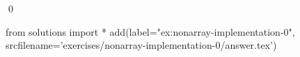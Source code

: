 
\begin{ex} 
  \label{ex:nonarray-implementation-0}
  
  \qed
\end{ex} 
\begin{python0}
from solutions import *
add(label="ex:nonarray-implementation-0",
    srcfilename='exercises/nonarray-implementation-0/answer.tex') 
\end{python0}
